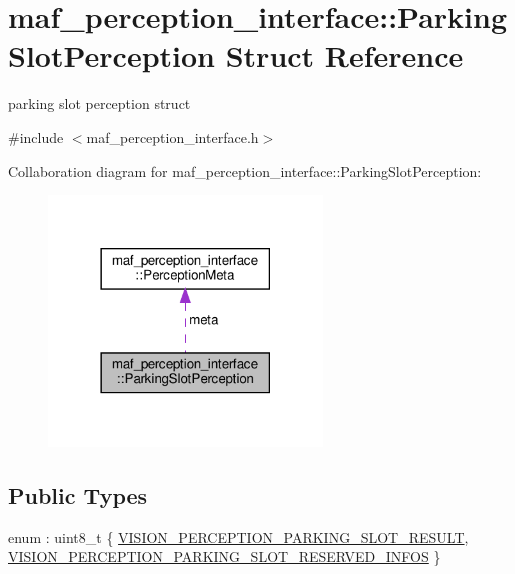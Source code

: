 \hypertarget{structmaf__perception__interface_1_1ParkingSlotPerception}{}\section{maf\+\_\+perception\+\_\+interface\+:\+:Parking\+Slot\+Perception Struct Reference}
\label{structmaf__perception__interface_1_1ParkingSlotPerception}


parking slot perception struct  




{\ttfamily \#include $<$maf\+\_\+perception\+\_\+interface.\+h$>$}



Collaboration diagram for maf\+\_\+perception\+\_\+interface\+:\+:Parking\+Slot\+Perception\+:\nopagebreak
\begin{figure}[H]
\begin{center}
\leavevmode
\includegraphics[width=206pt]{structmaf__perception__interface_1_1ParkingSlotPerception__coll__graph}
\end{center}
\end{figure}
\subsection*{Public Types}
\begin{DoxyCompactItemize}
\item 
enum \+: uint8\+\_\+t \{ \hyperlink{structmaf__perception__interface_1_1ParkingSlotPerception_addfbb20b727e60d1e539a42b80cd74c5a6fde84c533d53ad5bd75c3a3941c8d5c}{V\+I\+S\+I\+O\+N\+\_\+\+P\+E\+R\+C\+E\+P\+T\+I\+O\+N\+\_\+\+P\+A\+R\+K\+I\+N\+G\+\_\+\+S\+L\+O\+T\+\_\+\+R\+E\+S\+U\+LT}, 
\hyperlink{structmaf__perception__interface_1_1ParkingSlotPerception_addfbb20b727e60d1e539a42b80cd74c5aa37d61fd7a1fb8b12118485bab3e606a}{V\+I\+S\+I\+O\+N\+\_\+\+P\+E\+R\+C\+E\+P\+T\+I\+O\+N\+\_\+\+P\+A\+R\+K\+I\+N\+G\+\_\+\+S\+L\+O\+T\+\_\+\+R\+E\+S\+E\+R\+V\+E\+D\+\_\+\+I\+N\+F\+OS}
 \}
\end{DoxyCompactItemize}
